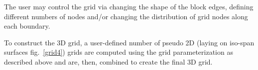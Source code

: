 The user may control the grid via changing the shape of the block edges, defining different numbers of nodes and/or changing the distribution of grid nodes along each boundary.%




To construct the 3D grid, a user-defined number of pseudo 2D (laying on iso-span surfaces fig.\ \ref{grid4}) grids are computed using the grid parameterization as described above and are, then, combined to create the final 3D grid.

